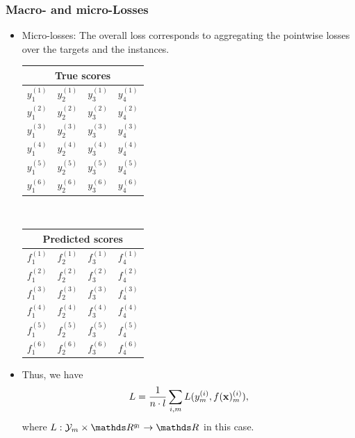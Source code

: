 \documentclass[11pt,compress,t,notes=noshow, xcolor=table]{beamer}
\begin{document}
\begin{frame}
	\frametitle{Macro- and micro-Losses}
	
	\begin{itemize}
		\item<1-> Micro-losses: The overall loss corresponds to aggregating the pointwise losses over the targets and the instances.
		
		\begin{center}
			\begin{tabular}{|c|c|c|c|}
				\multicolumn{4}{c}{True scores} \\
				\hline
				\color{putred}$y_1^{(1)}$ & \color{putred}$y_2^{(1)}$ & \color{putred}$y_3^{(1)}$ & \color{putred}$y_4^{(1)}$ \\
				\color{putred}$y_1^{(2)}$ & \color{putred}$y_2^{(2)}$ & \color{putred}$y_3^{(2)}$ & \color{putred}$y_4^{(2)}$ \\
				\color{putred}$y_1^{(3)}$ & \color{putred}$y_2^{(3)}$ & \color{putred}$y_3^{(3)}$ & \color{putred}$y_4^{(3)}$ \\
				\color{putred}$y_1^{(4)}$ & \color{putred}$y_2^{(4)}$ & \color{putred}$y_3^{(4)}$ & \color{putred}$y_4^{(4)}$ \\
				\color{putred}$y_1^{(5)}$ & \color{putred}$y_2^{(5)}$ & \color{putred}$y_3^{(5)}$ & \color{putred}$y_4^{(5)}$ \\
				\color{putred}$y_1^{(6)}$ & \color{putred}$y_2^{(6)}$ & \color{putred}$y_3^{(6)}$ & \color{putred}$y_4^{(6)}$ \\
				\hline
			\end{tabular}
			$\quad$
			\begin{tabular}{|c|c|c|c|}
				\multicolumn{4}{c}{Predicted scores} \\
				\hline
				\color{putred}$f_1^{(1)}$ & \color{putred}$f_2^{(1)}$ & \color{putred}$f_3^{(1)}$ & \color{putred}$f_4^{(1)}$ \\
				\color{putred}$f_1^{(2)}$ & \color{putred}$f_2^{(2)}$ & \color{putred}$f_3^{(2)}$ & \color{putred}$f_4^{(2)}$ \\
				\color{putred}$f_1^{(3)}$ & \color{putred}$f_2^{(3)}$ & \color{putred}$f_3^{(3)}$ & \color{putred}$f_4^{(3)}$ \\
				\color{putred}$f_1^{(4)}$ & \color{putred}$f_2^{(4)}$ & \color{putred}$f_3^{(4)}$ & \color{putred}$f_4^{(4)}$ \\
				\color{putred}$f_1^{(5)}$ & \color{putred}$f_2^{(5)}$ & \color{putred}$f_3^{(5)}$ & \color{putred}$f_4^{(5)}$ \\
				\color{putred}$f_1^{(6)}$ & \color{putred}$f_2^{(6)}$ & \color{putred}$f_3^{(6)}$ & \color{putred}$f_4^{(6)}$ \\
				\hline
			\end{tabular}
		\end{center}
	\lz
	\item Thus, we have	
	$$
	L =  \frac{1}{n \cdot l} \sum_{i,m} L(y_m^{(i)} , f(\mathbf{x})_m^{(i)}),
	$$
	where $L: \Yspace_m \times \R^{g_l} \to \R$ in this case.
%	
	\end{itemize}

\end{frame}
\end{document}
